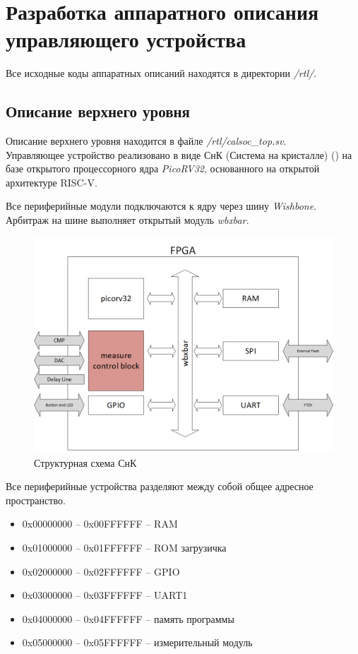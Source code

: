 \chapter{Разработка аппаратного описания управляющего устройства}

Все исходные коды аппаратных описаний находятся в директории \emph{/rtl/}.

\section{Описание верхнего уровня}

Описание верхнего уровня находится в файле \emph{/rtl/calsoc\_top.sv}.\\

Управляющее устройство реализовано в виде СнК (Система на кристалле) () на базе открытого процессорного
ядра \emph{PicoRV32}, основанного на открытой архитектуре RISC-V.

Все периферийные модули подключаются к ядру через шину \emph{Wishbone}. Арбитраж на шине выполняет открытый модуль
\emph{wbxbar}.

\begin{figure}[ht!] 
	\center
	\includegraphics [scale=0.7] {my_folder/images//calsoc}
	\caption{Структурная схема СнК} 
	\label{fig:calsoc}  
\end{figure}

Все периферийные устройства разделяют между собой общее адресное пространство.

\begin{itemize}[label={}]
	\item 0x00000000 -- 0x00FFFFFF -- RAM 
	\item 0x01000000 -- 0x01FFFFFF -- ROM загрузичка
	\item 0x02000000 -- 0x02FFFFFF -- GPIO
	\item 0x03000000 -- 0x03FFFFFF -- UART1
	\item 0x04000000 -- 0x04FFFFFF -- память программы
	\item 0x05000000 -- 0x05FFFFFF -- измерительный модуль
\end{itemize}


